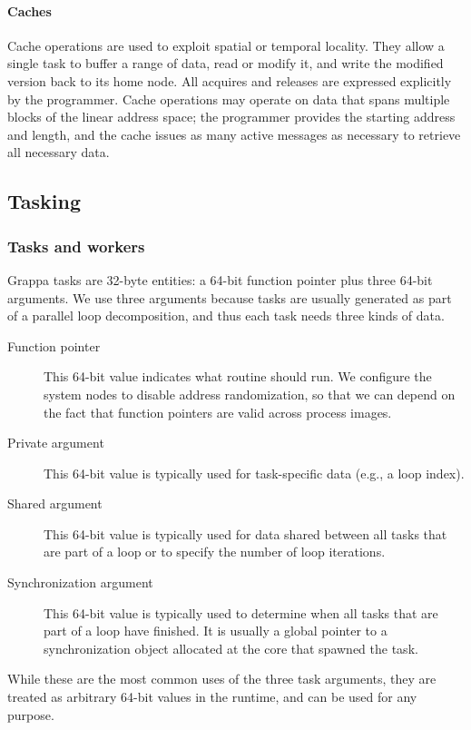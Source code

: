 \paragraph{Caches} Cache operations are used to exploit spatial or temporal
locality. They allow a single task to buffer a range of data, read or
modify it, and write the modified version back to its home node. All
acquires and releases are expressed explicitly by the
programmer. Cache operations may operate on data that spans multiple
blocks of the linear address space; the programmer provides the
starting address and length, and the cache issues as many active
messages as necessary to retrieve all necessary data.



\subsection{Tasking}

\subsubsection{Tasks and workers}

Grappa tasks are 32-byte entities: a 64-bit function pointer plus
three 64-bit arguments. We use three arguments because tasks are
usually generated as part of a parallel loop decomposition, and thus
each task needs three kinds of data.
\begin{description}
\item[Function pointer] This 64-bit value indicates what routine
  should run. We configure the system nodes to disable address randomization, so that we can depend on the fact that function pointers are valid across process images.
\item[Private argument] This 64-bit value is typically used for task-specific
  data (e.g., a loop index).
\item[Shared argument] This 64-bit value is typically used for data shared
  between all tasks that are part of a loop or to specify the number
  of loop iterations.
\item[Synchronization argument] This 64-bit value is typically used to determine
  when all tasks that are part of a loop have finished. It is usually
  a global pointer to a synchronization object allocated at the core
  that spawned the task.
\end{description}
While these are the most common uses of the three task arguments, they
are treated as arbitrary 64-bit values in the runtime, and can be used
for any purpose.


